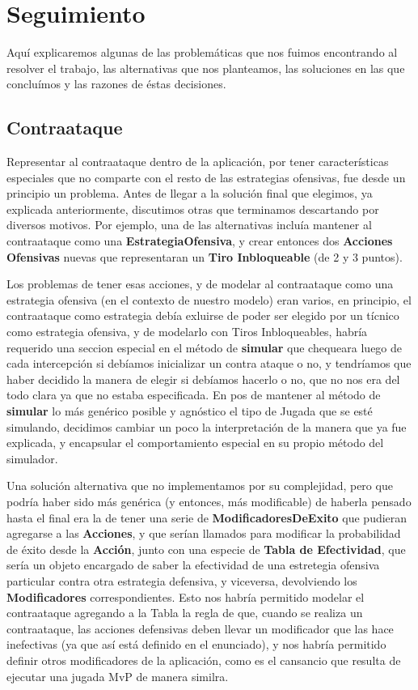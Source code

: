 \section{Seguimiento}

Aquí explicaremos algunas de las problemáticas que nos fuimos encontrando al resolver el trabajo, las alternativas que nos planteamos, las soluciones en las que concluímos y las razones de éstas decisiones.

\subsection{Contraataque}

Representar al contraataque dentro de la aplicación, por tener características especiales que no comparte con el resto de las estrategias ofensivas, fue desde un principio un problema. Antes de llegar a la solución final que elegimos, ya explicada anteriormente, discutimos otras que terminamos descartando por diversos motivos. Por ejemplo, una de las alternativas incluía mantener al contraataque como una \textbf{EstrategiaOfensiva}, y crear entonces dos \textbf{Acciones Ofensivas} nuevas que representaran un \textbf{Tiro Inbloqueable} (de 2 y 3 puntos). 

Los problemas de tener esas acciones, y de modelar al contraataque como una estrategia ofensiva (en el contexto de nuestro modelo) eran varios, en principio, el contraataque como estrategia debía exluirse de poder ser elegido por un tícnico como estrategia ofensiva, y de modelarlo con Tiros Inbloqueables, habría requerido una seccion especial en el método de \textbf{simular} que chequeara luego de cada intercepción si debíamos inicializar un contra ataque o no, y tendríamos que haber decidido la manera de elegir si debíamos hacerlo o no, que no nos era del todo clara ya que no estaba especificada. En pos de mantener al método de \textbf{simular} lo más genérico posible y agnóstico el tipo de Jugada que se esté simulando, decidimos cambiar un poco la interpretación de la manera que ya fue explicada, y encapsular el comportamiento especial en su propio método del simulador.

Una solución alternativa que no implementamos por su complejidad, pero que podría haber sido más genérica (y entonces, más modificable) de haberla pensado hasta el final era la de tener una serie de \textbf{ModificadoresDeExito} que pudieran agregarse a las \textbf{Acciones}, y que serían llamados para modificar la probabilidad de éxito desde la \textbf{Acción}, junto con una especie de \textbf{Tabla de Efectividad}, que sería un objeto encargado de saber la efectividad de una estretegia ofensiva particular contra otra estrategia defensiva, y viceversa, devolviendo los \textbf{Modificadores} correspondientes. Esto nos habría permitido modelar el contraataque agregando a la Tabla la regla de que, cuando se realiza un contraataque, las acciones defensivas deben llevar un modificador que las hace inefectivas (ya que así está definido en el enunciado), y nos habría permitido definir otros modificadores de la aplicación, como es el cansancio que resulta de ejecutar una jugada MvP de manera similra.

